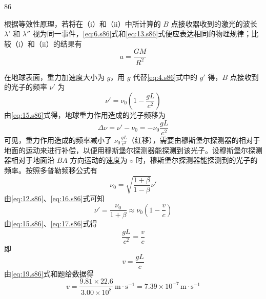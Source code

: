 \begin{solution}{86}
\begin{subsolution}
\begin{subsubsolution}
\begin{subsubsubsolution}
\begin{subsubsubsubsolution}
                    根据等效性原理，若将在（i）和（ii）中所计算的 $B$ 点接收器收到的激光的波长 $\lambda'$ 和 $\lambda''$ 视为同一事件，\eqref{eq:6.s86}式和\eqref{eq:13.s86}式便应表达相同的物理规律；比较（i）和（ii）的结果有
                    \begin{equation}
                        a = \frac{G M}{R^{2}}
                        \label{eq:14.s86}
                    \end{equation}
                \end{subsubsubsubsolution}
            \end{subsubsubsolution}
        \end{subsubsolution}
        \begin{subsubsolution}
            在地球表面，重力加速度大小为 $g$，用 $g$ 代替\eqref{eq:4.s86}式中的 $g'$ 得，$B$ 点接收到的光子的频率 $\nu'$ 为
            \begin{equation}
                \nu' = \nu_{0} \left(1 - \frac{g L}{c^{2}}\right)
                \label{eq:15.s86}
            \end{equation}
            由\eqref{eq:15.s86}式得，地球重力作用造成的光子频移为
            \[
                \Delta \nu = \nu' - \nu_{0} = - \nu_{0} \frac{g L}{c^{2}}
            \]
            可见，重力作用造成的频率减小了 $\nu_{0}\frac{gL}{c^{2}}$（红移），需要由穆斯堡尔探测器的相对于地面的运动来进行补偿，以便用穆斯堡尔探测器能探测到该光子。设穆斯堡尔探测器相对于地面沿 $BA$ 方向运动的速度为 $v$ 时，穆斯堡尔探测器能探测到的光子的频率。按照多普勒频移公式有
            \begin{equation}
                \nu_{0} = \sqrt{\frac{1+\beta}{1-\beta}} \nu'
                \label{eq:16.s86}
            \end{equation}
            由\eqref{eq:12.s86}、\eqref{eq:16.s86}式可知
            \begin{equation}
                \nu' = \frac{\nu_{0}}{1+\beta} \approx \nu_{0} \left(1 - \frac{v}{c}\right)
                \label{eq:17.s86}
            \end{equation}
            由\eqref{eq:15.s86}、\eqref{eq:17.s86}式得
            \begin{equation}
                \frac{g L}{c^{2}} = \frac{v}{c}
                \label{eq:18.s86}
            \end{equation}
            即
            \begin{equation}
                v = \frac{g L}{c}
                \label{eq:19.s86}
            \end{equation}
            由\eqref{eq:19.s86}式和题给数据得
            \begin{equation}
                v = \frac{9.81 \times 22.6}{3.00 \times 10^{8}}\,\mathrm{m\cdot s^{-1}} = 7.39 \times 10^{-7}\,\mathrm{m\cdot s^{-1}}
                \label{eq:20.s86}
            \end{equation}
        \end{subsubsolution}
    \end{subsolution}
\end{solution}